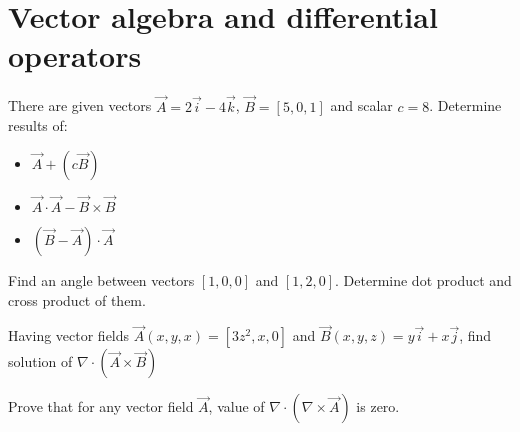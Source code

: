 \section{Vector algebra and differential operators}

\begin{Exercise}[difficulty=1]
There are given vectors $\vec A = 2 \vec{i} - 4\vec{k}$, $\vec B = [5, 0, 1]$ and scalar $c = 8$. Determine results of:

\begin{itemize}
\item $\vec A + (c \vec B)$
\item $\vec A \cdot \vec A - \vec B \times \vec B$
\item $(\vec B - \vec A) \cdot \vec A$
\end{itemize}

\end{Exercise}


\begin{Exercise}[difficulty=1]
Find an angle between vectors $[1,0,0]$ and $[1,2,0]$. Determine dot product and cross product of them.
\end{Exercise}


\begin{Exercise}[difficulty=2]
Having vector fields $\vec A (x,y,x) = [3z^2, x, 0]$ and $\vec B (x,y,z) = y\vec{i} + x\vec{j}$, find solution of $\nabla \cdot (\vec A \times \vec{B})$
\end{Exercise}

\begin{Exercise}[difficulty=2]
Prove that for any vector field $\vec A$, value of $\nabla \cdot (\nabla \times \vec{A})$ is zero.
\end{Exercise}
